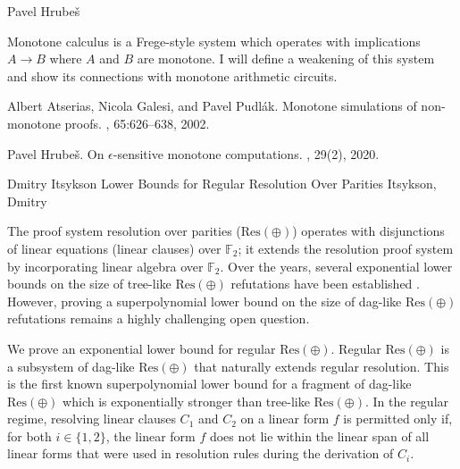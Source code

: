\documentclass[report]{owrart}
\newcommand{\resoplus}{\mathrm{Res}(\oplus)}
\begin{document}
\begin{report}
\begin{talk}{Pavel Hrube\v{s}}
        \noindent
       
        Monotone calculus is a Frege-style system which operates with implications $A\rightarrow B$ where $A$ and $B$ are monotone. I will define a weakening of this system and show its connections with monotone arithmetic circuits.
    
    
        \begin{thebibliography}{99}
        
        Albert Atserias, Nicola Galesi, and Pavel Pudl\'{a}k.
        \newblock Monotone simulations of non-monotone proofs.
        , 65:626--638, 2002.
    
        Pavel Hrube\v{s}.
        \newblock On $\epsilon$-sensitive monotone computations.
        , 29(2), 2020.
    
        
        \end{thebibliography}
        
        \end{talk}
    


    
    \begin{talk}{Dmitry Itsykson}
      {Lower Bounds for Regular Resolution Over Parities}
      {Itsykson, Dmitry}
      
      \noindent
     
      The proof system resolution over parities ($\resoplus$) \cite{IS14, IS20} operates with disjunctions of linear equations 
    (linear clauses) over $\mathbb{F}_2$; 
it extends the resolution proof system by incorporating linear algebra over $\mathbb{F}_2$.  
Over the years, several exponential lower bounds on the size of tree-like $\resoplus$ refutations have 
been established \cite{IS14, GK18, Krajicek18, Gryaznov19, PartT21, IR21, Khaniki22, BK23, CMSS23}. However, proving a superpolynomial lower bound on the size of dag-like $\resoplus$ refutations remains a highly challenging open question.

We prove an exponential lower bound for regular  $\resoplus$. Regular $\resoplus$ is a subsystem of dag-like $\resoplus$ that naturally extends regular resolution. This is the first known superpolynomial lower bound for a fragment of dag-like $\resoplus$ which is exponentially stronger than tree-like $\resoplus$.
In the regular regime, resolving linear clauses $C_1$ and $C_2$ on a linear form $f$ is permitted only if, for both $i\in \{1,2\}$, the linear form $f$ does not lie within the linear span of all linear forms that were used in resolution rules during the derivation of $C_i$.


\end{talk}
\end{report}
\end{document}
